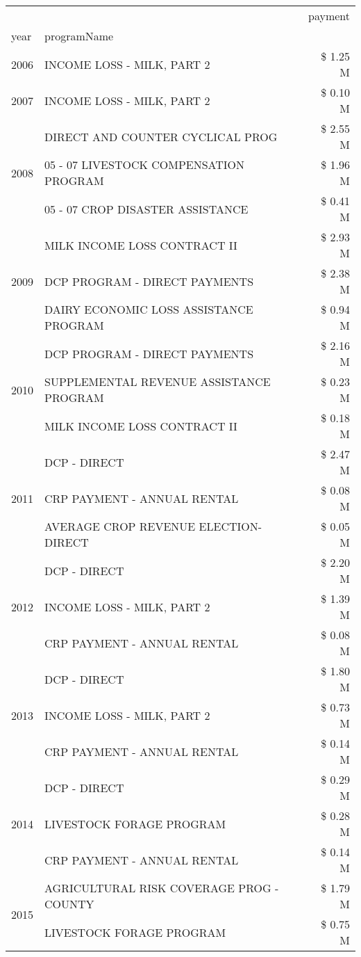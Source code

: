 \begin{tabular}{llr}
\toprule
 &  & payment \\
year & programName &  \\
\midrule
2006 & INCOME LOSS - MILK, PART 2 & \$ 1.25 M \\
\cline{1-3}
2007 & INCOME LOSS - MILK, PART 2 & \$ 0.10 M \\
\cline{1-3}
\multirow[t]{3}{*}{2008} & DIRECT AND COUNTER CYCLICAL PROG & \$ 2.55 M \\
 & 05 - 07 LIVESTOCK COMPENSATION PROGRAM & \$ 1.96 M \\
 & 05 - 07 CROP DISASTER ASSISTANCE & \$ 0.41 M \\
\cline{1-3}
\multirow[t]{3}{*}{2009} & MILK INCOME LOSS CONTRACT II & \$ 2.93 M \\
 & DCP PROGRAM - DIRECT PAYMENTS & \$ 2.38 M \\
 & DAIRY ECONOMIC LOSS ASSISTANCE PROGRAM & \$ 0.94 M \\
\cline{1-3}
\multirow[t]{3}{*}{2010} & DCP PROGRAM - DIRECT PAYMENTS & \$ 2.16 M \\
 & SUPPLEMENTAL REVENUE ASSISTANCE PROGRAM & \$ 0.23 M \\
 & MILK INCOME LOSS CONTRACT II & \$ 0.18 M \\
\cline{1-3}
\multirow[t]{3}{*}{2011} & DCP - DIRECT & \$ 2.47 M \\
 & CRP PAYMENT - ANNUAL RENTAL & \$ 0.08 M \\
 & AVERAGE CROP REVENUE ELECTION-DIRECT & \$ 0.05 M \\
\cline{1-3}
\multirow[t]{3}{*}{2012} & DCP - DIRECT & \$ 2.20 M \\
 & INCOME LOSS - MILK, PART 2 & \$ 1.39 M \\
 & CRP PAYMENT - ANNUAL RENTAL & \$ 0.08 M \\
\cline{1-3}
\multirow[t]{3}{*}{2013} & DCP - DIRECT & \$ 1.80 M \\
 & INCOME LOSS - MILK, PART 2 & \$ 0.73 M \\
 & CRP PAYMENT - ANNUAL RENTAL & \$ 0.14 M \\
\cline{1-3}
\multirow[t]{3}{*}{2014} & DCP - DIRECT & \$ 0.29 M \\
 & LIVESTOCK FORAGE PROGRAM & \$ 0.28 M \\
 & CRP PAYMENT - ANNUAL RENTAL & \$ 0.14 M \\
\cline{1-3}
\multirow[t]{3}{*}{2015} & AGRICULTURAL RISK COVERAGE PROG - COUNTY & \$ 1.79 M \\
 & LIVESTOCK FORAGE PROGRAM & \$ 0.75 M \\

\end{tabular}

